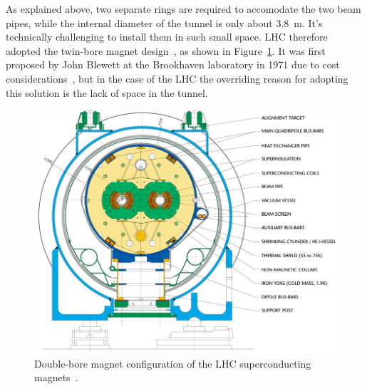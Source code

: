 As explained above, two separate rings are required to accomodate the two beam pipes, while
the internal diameter of the tunnel is only about 3.8~m. It's technically challenging to 
install them in such small space. LHC therefore adopted the twin-bore magnet design~\cite{rossi2003lhc}, 
as shown in Figure~\ref{fig:double-bore-magnet}. It was first proposed by John Blewett at the Brookhaven 
laboratory in 1971 due to cost considerations~\cite{Blewett:1971zzb}, but in the case 
of the LHC the overriding reason for adopting this solution	is the lack of space in the tunnel. 
\begin{figure}[bht]
	\begin{centering}	
	\includegraphics[width=.7\textwidth]{Detector/plots/LHC-double-bore-magnet.jpg}
	\caption{ Double-bore magnet configuration of the LHC 
	superconducting magnets~\cite{rossi2003lhc}.}
	\label{fig:double-bore-magnet}
	\end{centering}
\end{figure}

